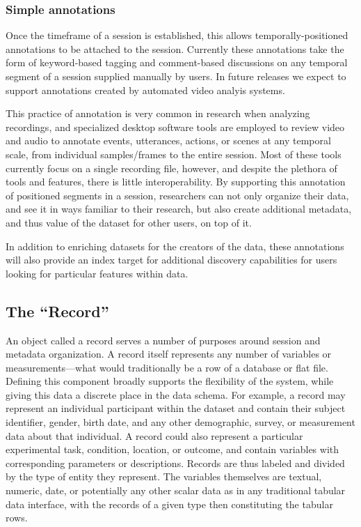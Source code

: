 \documentclass{sig-alternate}
\begin{document}
\subsubsection*{Simple annotations}

Once the timeframe of a session is established, this allows temporally-positioned annotations to be attached to the session. Currently these annotations take the form of keyword-based tagging and comment-based discussions on any temporal segment of a session supplied manually by users. In future releases we expect to support annotations created by automated video analyis systems.

This practice of annotation is very common in research when analyzing recordings, and specialized desktop software tools are employed to review video and audio to annotate events, utterances, actions, or scenes at any temporal scale, from individual samples/frames to the entire session.
Most of these tools currently focus on a single recording file, however, and despite the plethora of tools and features, there is little interoperability. By supporting this annotation of positioned segments in a session, researchers can not only organize their data, and see it in ways familiar to their research, but also create additional metadata, and thus value of the dataset for other users, on top of it. 

In addition to enriching datasets for the creators of the data, these annotations will also provide an index target for additional discovery capabilities for users looking for particular features within data.

\subsection{The ``Record''}

An object called a record serves a number of purposes around session and metadata organization. 
A record itself represents any number of variables or measurements---what would traditionally be a row of a database or flat file. Defining this component broadly supports the flexibility of the system, while giving this data a discrete place in the data schema.
For example, a record may represent an individual participant within the dataset and contain their subject identifier, gender, birth date, and any other demographic, survey, or measurement data about that individual.
A record could also represent a particular experimental task, condition, location, or outcome, and contain variables with corresponding parameters or descriptions.
Records are thus labeled and divided by the type of entity they represent.
The variables themselves are textual, numeric, date, or potentially any other scalar data as in any traditional tabular data interface, with the records of a given type then constituting the tabular rows.
\end{document}

